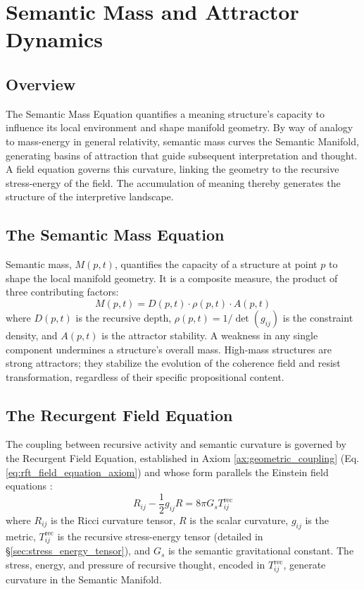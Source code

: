 \chapter{Semantic Mass and Attractor Dynamics}\label{ch:attractor_dynamics}

\section{Overview}

The Semantic Mass Equation quantifies a meaning structure's capacity to influence its local environment and shape manifold geometry. By way of analogy to mass-energy in general relativity, semantic mass curves the Semantic Manifold, generating basins of attraction that guide subsequent interpretation and thought. A field equation governs this curvature, linking the geometry to the recursive stress-energy of the field. The accumulation of meaning thereby generates the structure of the interpretive landscape.

\section{The Semantic Mass Equation}\label{sec:semantic_mass_equation}

Semantic mass, \(M(p,t)\), quantifies the capacity of a structure at point \(p\) to shape the local manifold geometry. It is a composite measure, the product of three contributing factors:
\begin{equation}
M(p, t) = D(p, t) \cdot \rho(p, t) \cdot A(p, t)
\end{equation}
where \(D(p, t)\) is the recursive depth, \(\rho(p, t) = 1/\det(g_{ij})\) is the constraint density, and \(A(p, t)\) is the attractor stability. A weakness in any single component undermines a structure's overall mass. High-mass structures are strong attractors; they stabilize the evolution of the coherence field and resist transformation, regardless of their specific propositional content.

\section{The Recurgent Field Equation}\label{sec:recurgent_field_equation}

The coupling between recursive activity and semantic curvature is governed by the Recurgent Field Equation, established in Axiom \ref{ax:geometric_coupling} (Eq. \ref{eq:rft_field_equation_axiom}) and whose form parallels the Einstein field equations \autocite{Einstein1915, MisnerThorneWheeler1973, Wald1984}:
\begin{equation}
R_{ij} - \frac{1}{2}g_{ij}R = 8\pi G_s T^{\text{rec}}_{ij}
\end{equation}
where \(R_{ij}\) is the Ricci curvature tensor, \(R\) is the scalar curvature, \(g_{ij}\) is the metric, \(T^{\text{rec}}_{ij}\) is the recursive stress-energy tensor (detailed in \S\ref{sec:stress_energy_tensor}), and \(G_s\) is the semantic gravitational constant. The stress, energy, and pressure of recursive thought, encoded in \(T^{\text{rec}}_{ij}\), generate curvature in the Semantic Manifold.

